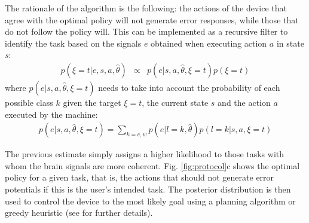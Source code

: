 The rationale of the algorithm is the following: the actions of the device that agree with the optimal policy will not generate error responses, while those that do not follow the policy will. This can be implemented as a recursive filter to identify the task based on the signals $e$ obtained when executing action $a$ in state $s$:
%
\begin{eqnarray}
p(\xi=t|e, s, a, \hat{\theta}) & \propto & p(e |s, a, \hat{\theta}, \xi=t) p(\xi=t)
\label{eq:1}
\end{eqnarray}
%
where  $p(e |s, a, \hat{\theta}, \xi=t)$ needs to take into account the probability of each possible class $k$ given the target $\xi=t$, the current state $s$ and the action $a$ executed by the machine:
%
\begin{eqnarray}
p(e |s, a, \hat{\theta}, \xi=t) =  \sum_{k = c,w} p(e |l = k, \hat{\theta}) p(l = k| s, a, \xi=t)
\label{eq:2}
\end{eqnarray}

The previous estimate simply assigns a higher likelihood to those tasks with whom the brain signals are more coherent. Fig.  \ref{fig:protocol}c shows the optimal policy for a given task, that is, the actions that should not generate error potentials if this is the user's intended task. The posterior distribution is then used to control the device to the most likely goal using a planning algorithm or greedy heuristic (see \cite{iturrate13} for further details).


